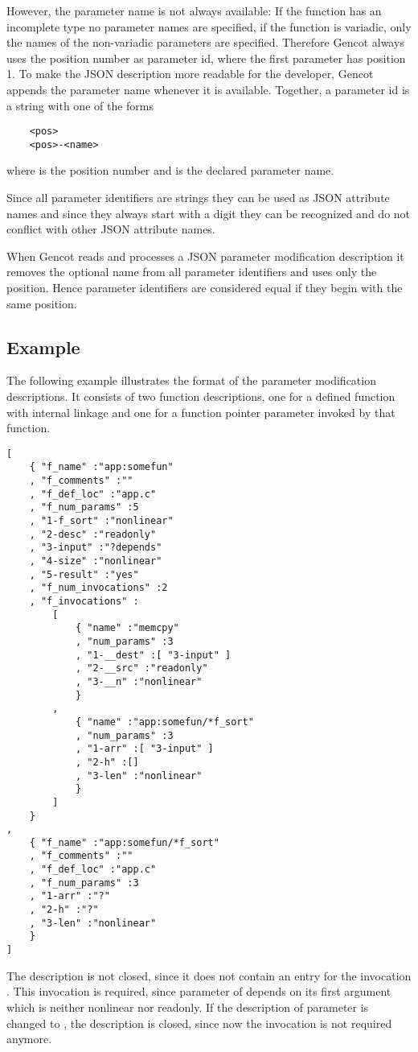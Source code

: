 However, the parameter name is not always available: If the function has an incomplete type no parameter names are
specified, if the function is variadic, only the names of the non-variadic parameters are specified. Therefore
Gencot always uses the position number as parameter id, where the first parameter has position 1. To make the JSON
description more readable for the developer, Gencot appends the parameter name whenever it is available. Together,
a parameter id is a string with one of the forms
\begin{verbatim}
    <pos>
    <pos>-<name>
\end{verbatim}
where  is the position number and  is the declared parameter name.

Since all parameter identifiers are strings they can be used as JSON attribute names and since they always
start with a digit they can be recognized and do not conflict with other JSON attribute names. 

When Gencot reads and processes a JSON parameter modification description it removes the optional name from 
all parameter identifiers and uses only the position. Hence parameter identifiers are considered equal if they
begin with the same position.

\subsection{Example}

The following example illustrates the format of the parameter modification descriptions. It consists of two
function descriptions, one for a defined function with internal linkage and one for a function pointer parameter
invoked by that function.
\begin{verbatim}
[
    { "f_name" :"app:somefun" 
    , "f_comments" :"" 
    , "f_def_loc" :"app.c" 
    , "f_num_params" :5
    , "1-f_sort" :"nonlinear" 
    , "2-desc" :"readonly" 
    , "3-input" :"?depends" 
    , "4-size" :"nonlinear" 
    , "5-result" :"yes" 
    , "f_num_invocations" :2
    , "f_invocations" :
        [ 
            { "name" :"memcpy" 
            , "num_params" :3
            , "1-__dest" :[ "3-input" ]
            , "2-__src" :"readonly" 
            , "3-__n" :"nonlinear" 
            } 
        , 
            { "name" :"app:somefun/*f_sort" 
            , "num_params" :3
            , "1-arr" :[ "3-input" ]
            , "2-h" :[]
            , "3-len" :"nonlinear" 
            } 
        ] 
    } 
, 
    { "f_name" :"app:somefun/*f_sort"
    , "f_comments" :"" 
    , "f_def_loc" :"app.c" 
    , "f_num_params" :3
    , "1-arr" :"?" 
    , "2-h" :"?" 
    , "3-len" :"nonlinear" 
    } 
]
\end{verbatim}
The description is not closed, since it does not contain an entry for the invocation . This
invocation is required, since parameter  of  depends on its first argument
which is neither nonlinear nor readonly. If the description of parameter  is changed
to , the description is closed, since now the invocation  is not required
anymore.

